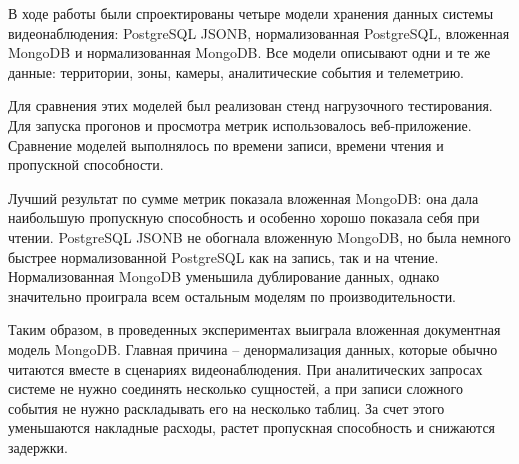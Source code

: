 В ходе работы были спроектированы четыре модели хранения данных
системы видеонаблюдения: PostgreSQL JSONB, нормализованная PostgreSQL,
вложенная MongoDB и нормализованная MongoDB. Все модели описывают одни и те
же данные: территории, зоны, камеры, аналитические события и телеметрию.

Для сравнения этих моделей был реализован стенд нагрузочного тестирования.
Для запуска прогонов и просмотра метрик использовалось веб-приложение.
Сравнение моделей выполнялось по времени записи, времени чтения и пропускной
способности.

Лучший результат по сумме метрик показала вложенная MongoDB: она дала
наибольшую пропускную способность и особенно хорошо показала себя при чтении.
PostgreSQL JSONB не обогнала вложенную MongoDB, но была немного быстрее
нормализованной PostgreSQL как на запись, так и на чтение. Нормализованная
MongoDB уменьшила дублирование данных, однако значительно проиграла всем
остальным моделям по производительности.

Таким образом, в проведенных экспериментах выиграла вложенная документная
модель MongoDB. Главная причина -- денормализация данных, которые обычно
читаются вместе в сценариях видеонаблюдения. При аналитических запросах
системе не нужно соединять несколько сущностей, а при записи сложного события
не нужно раскладывать его на несколько таблиц. За счет этого уменьшаются
накладные расходы, растет пропускная способность и снижаются задержки.
